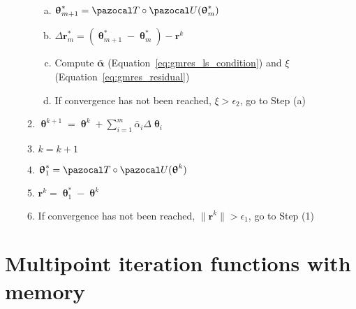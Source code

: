 \begin{framedbox}[htbp]
\begin{center}
\begin{minipage}{0.9\textwidth}
\begin{enumerate}[(i)]
\begin{enumerate}[(1)]
\begin{enumerate}[(a)]
        \item \(\bm \uptheta^*_{m+1} = \pazocal T \circ \pazocal U(\bm \uptheta^*_m)\)
        \item \(\Delta \mathbf r^*_m = (\bm\uptheta^*_{m+1} - \bm \uptheta^*_m) - \mathbf r^k\)
        \item Compute \(\bar{\mathbf\alpha}\) (Equation~\eqref{eq:gmres_ls_condition}) and \(\xi\) (Equation~\eqref{eq:gmres_residual})
        \item If convergence has not been reached, \(\xi>\epsilon_2\), go to Step (a)
      \end{enumerate}
    \item \(\bm\uptheta^{k+1} = \bm\uptheta^k + \sum_{i=1}^m \bar{\alpha}_i \Delta\bm\uptheta_i\)
    \item \(k=k+1\)
    \item \(\bm\uptheta^*_1 = \pazocal T\circ \pazocal U(\bm\uptheta^{k})\)
    \item \(\mathbf r^k = \bm\uptheta^*_1 - \bm \uptheta^k\)
    \item If convergence has not been reached, \(\|\mathbf r^k\| > \epsilon_1\), go to Step (1)
    \end{enumerate}
    \end{enumerate}
    \end{minipage}
  \end{center}
\end{framedbox}


\section{Multipoint iteration functions with memory}
